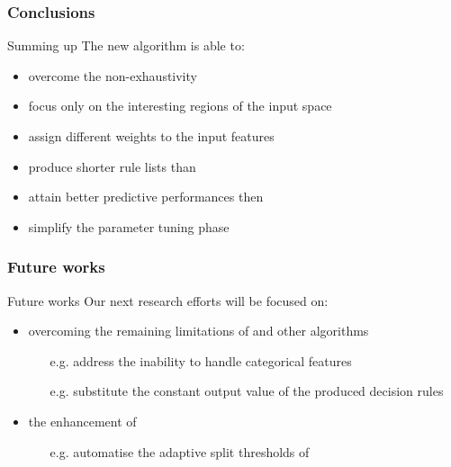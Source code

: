 \documentclass[presentation]{beamer}
\begin{document}
\begin{frame}%
\frametitle{Conclusions}

\begin{block}{Summing up}
	The new \gridex algorithm is able to:
    \begin{itemize}
        \item overcome the \iter non-exhaustivity
        \item focus only on the interesting regions of the input space
        \item assign different weights to the input features
        \item produce shorter rule lists than \iter
        \item attain better predictive performances then \iter
        \item simplify the parameter tuning phase
    \end{itemize}
\end{block}

\end{frame}

\begin{frame}
	\frametitle{Future works}

\begin{exampleblock}{Future works}
	Our next research efforts will be focused on:
	\begin{itemize}
		\item overcoming the remaining limitations of \iter and other algorithms
		\begin{itemize}
			\item[e.g.] address the inability to handle categorical features
			\item[e.g.] substitute the constant output value of the produced decision rules
		\end{itemize}	
		\item the enhancement of \gridex
	    \begin{itemize}
			\item[e.g.] automatise the adaptive split thresholds of \gridex
		\end{itemize}		
	\end{itemize}
\end{exampleblock}

\end{frame}
\end{document}
